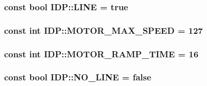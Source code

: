 \hypertarget{namespaceIDP_559427fa7c37f2edc0a43a4b793c4fdc}{
\subsubsection[{LINE}]{\setlength{\rightskip}{0pt plus 5cm}const bool {\bf IDP::LINE} = true}}
\label{namespaceIDP_559427fa7c37f2edc0a43a4b793c4fdc}


\hypertarget{namespaceIDP_4ead0b21ad2c507b542445695182d4cd}{
\subsubsection[{MOTOR\_\-MAX\_\-SPEED}]{\setlength{\rightskip}{0pt plus 5cm}const int {\bf IDP::MOTOR\_\-MAX\_\-SPEED} = 127}}
\label{namespaceIDP_4ead0b21ad2c507b542445695182d4cd}


\hypertarget{namespaceIDP_b3a00a6cc8a6dba271e38d337daf4703}{
\subsubsection[{MOTOR\_\-RAMP\_\-TIME}]{\setlength{\rightskip}{0pt plus 5cm}const int {\bf IDP::MOTOR\_\-RAMP\_\-TIME} = 16}}
\label{namespaceIDP_b3a00a6cc8a6dba271e38d337daf4703}


\hypertarget{namespaceIDP_5ea027b77276a637783f68955303b9b8}{
\subsubsection[{NO\_\-LINE}]{\setlength{\rightskip}{0pt plus 5cm}const bool {\bf IDP::NO\_\-LINE} = false}}
\label{namespaceIDP_5ea027b77276a637783f68955303b9b8}


